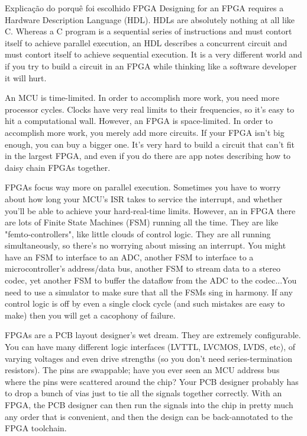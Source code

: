 		
	Explicação do porquê foi escolhido FPGA
	Designing for an FPGA requires a Hardware Description Language (HDL). HDLs are absolutely nothing at all like C. Whereas a C program is a sequential series of instructions and must contort itself to achieve parallel execution, an HDL describes a concurrent circuit and must contort itself to achieve sequential execution. It is a very different world and if you try to build a circuit in an FPGA while thinking like a software developer it will hurt.
	
	An MCU is time-limited. In order to accomplish more work, you need more processor cycles. Clocks have very real limits to their frequencies, so it's easy to hit a computational wall. However, an FPGA is space-limited. In order to accomplish more work, you merely add more circuits. If your FPGA isn't big enough, you can buy a bigger one. It's very hard to build a circuit that can't fit in the largest FPGA, and even if you do there are app notes describing how to daisy chain FPGAs together.
	
	FPGAs focus way more on parallel execution. Sometimes you have to worry about how long your MCU's ISR takes to service the interrupt, and whether you'll be able to achieve your hard-real-time limits. However, an in FPGA there are lots of Finite State Machines (FSM) running all the time. They are like "femto-controllers", like little clouds of control logic. They are all running simultaneously, so there's no worrying about missing an interrupt. You might have an FSM to interface to an ADC, another FSM to interface to a microcontroller's address/data bus, another FSM to stream data to a stereo codec, yet another FSM to buffer the dataflow from the ADC to the codec...You need to use a simulator to make sure that all the FSMs sing in harmony. If any control logic is off by even a single clock cycle (and such mistakes are easy to make) then you will get a cacophony of failure.
	
	FPGAs are a PCB layout designer's wet dream. They are extremely configurable. You can have many different logic interfaces (LVTTL, LVCMOS, LVDS, etc), of varying voltages and even drive strengths (so you don't need series-termination resistors). The pins are swappable; have you ever seen an MCU address bus where the pins were scattered around the chip? Your PCB designer probably has to drop a bunch of vias just to tie all the signals together correctly. With an FPGA, the PCB designer can then run the signals into the chip in pretty much any order that is convenient, and then the design can be back-annotated to the FPGA toolchain.
	
